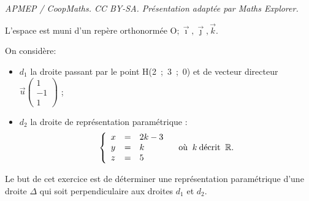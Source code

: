 \documentclass[10pt]{article}
\providecommand{\R}{\mathbb{R}}
\providecommand{\vect}[1]{\overrightarrow{#1}}
\providecommand{\Oijk}{\(\mathrm{O};\vec{\imath},\vec{\jmath},\vec{k}\)}
\begin{document}
\noindent\textit{APMEP / CoopMaths. CC BY-SA. Présentation adaptée par Maths Explorer.}\par\medskip
\medskip

L'espace est muni d'un repère orthonormée \Oijk.

On considère:
\begin{itemize}
\item[$\bullet~~$]$d_1$ la droite passant par le point H(2~;~3~;~0) et de vecteur directeur $\vect{u}\begin{pmatrix}1\\-1\\1\end{pmatrix}$ ;
\item[$\bullet~~$]$d_2$  la droite de représentation paramétrique :
\[\left\{\begin{array}{l c l}
x &=& 2k - 3\\
y &=&k\\
z &=&5
\end{array}\right. \quad \text{où }\:k \:\text{décrit }\: \R.\]
\end{itemize}

\medskip

Le but de cet exercice est de déterminer une représentation paramétrique d'une droite $\Delta$ qui soit perpendiculaire aux droites $d_1$ et $d_2$.

\medskip
\end{document}
